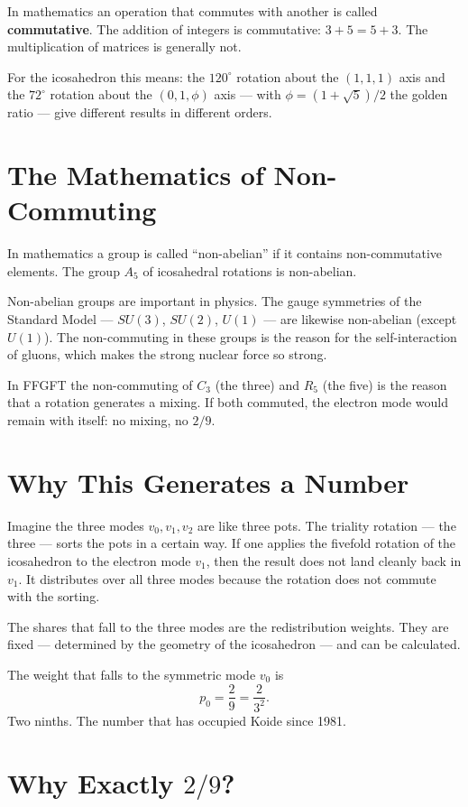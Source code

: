 \documentclass[12pt,oneside]{book}
\begin{document}
In mathematics an operation that commutes with another is called \textbf{commutative}. The addition of integers is commutative: $3 + 5 = 5 + 3$. The multiplication of matrices is generally not.

For the icosa\-hedron this means: the $120^\circ$ rotation about the $(1, 1, 1)$ axis and the $72^\circ$ rotation about the $(0, 1, \phi)$ axis --- with $\phi = (1 + \sqrt{5})/2$ the golden ratio --- give different results in different orders.

\section{The Mathematics of Non-Commuting}

In mathematics a group is called ``non-abelian'' if it contains non-commutative elements. The group $A_5$ of icosahedral rotations is non-abelian.

Non-abelian groups are important in physics. The gauge symmetries of the Standard Model --- $SU(3)$, $SU(2)$, $U(1)$ --- are likewise non-abelian (except $U(1)$). The non-commuting in these groups is the reason for the self-interaction of gluons, which makes the strong nuclear force so strong.

In FFGFT the non-commuting of $C_3$ (the three) and $R_5$ (the five) is the reason that a rotation generates a mixing. If both commuted, the electron mode would remain with itself: no mixing, no $2/9$.

\section{Why This Generates a Number}

Imagine the three modes $v_0, v_1, v_2$ are like three pots. The triality rotation --- the three --- sorts the pots in a certain way. If one applies the fivefold rotation of the icosa\-hedron to the electron mode $v_1$, then the result does not land cleanly back in $v_1$. It distributes over all three modes because the rotation does not commute with the sorting.

The shares that fall to the three modes are the redistribution weights. They are fixed --- determined by the geometry of the icosa\-hedron --- and can be calculated.

The weight that falls to the symmetric mode $v_0$ is
\[
p_0 = \frac{2}{9} = \frac{2}{3^2}.
\]
Two ninths. The number that has occupied Koide since 1981.

\section{Why Exactly $2/9$?}
\end{document}
